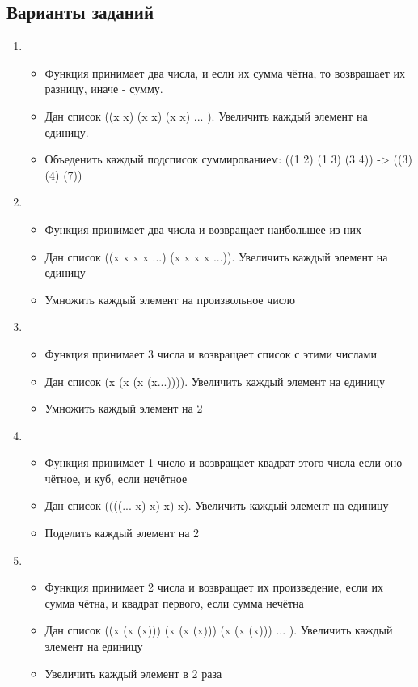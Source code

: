 \documentclass[a4paper,12pt]{article}
\begin{document}
\subsection{Варианты заданий}
\begin{enumerate}
	\item \begin{itemize}
		\item Функция принимает два числа, и если их сумма чётна, то возвращает их разницу, иначе - сумму.
		\item Дан список ((x x) (x x) (x x) ... ). Увеличить каждый элемент на единицу.
		\item Объеденить каждый подсписок суммированием: ((1 2) (1 3) (3 4)) -> ((3) (4) (7))
	\end{itemize}

	\item \begin{itemize}
		\item Функция принимает два числа и возвращает наибольшее из них
		\item Дан список ((x x x x ...) (x x x x ...)). Увеличить каждый элемент на единицу
		\item Умножить каждый элемент на произвольное число
	\end{itemize}

	\item \begin{itemize}
		\item Функция принимает 3 числа и возвращает список с этими числами
		\item Дан список (x (x (x (x...)))). Увеличить каждый элемент на единицу
		\item Умножить каждый элемент на 2
	\end{itemize}

	\item \begin{itemize}
		\item Функция принимает 1 число и возвращает квадрат этого числа если оно чётное, и куб, если нечётное
		\item Дан список ((((... x) x) x) x). Увеличить каждый элемент на единицу
		\item Поделить каждый элемент на 2
	\end{itemize}

	\item \begin{itemize}
		\item Функция принимает 2 числа и возвращает их произведение, если их сумма чётна, и квадрат первого, если сумма нечётна
		\item Дан список ((x (x (x))) (x (x (x))) (x (x (x))) ... ). Увеличить каждый элемент на единицу
		\item Увеличить каждый элемент в 2 раза
	\end{itemize}


\end{enumerate}
\end{document}

